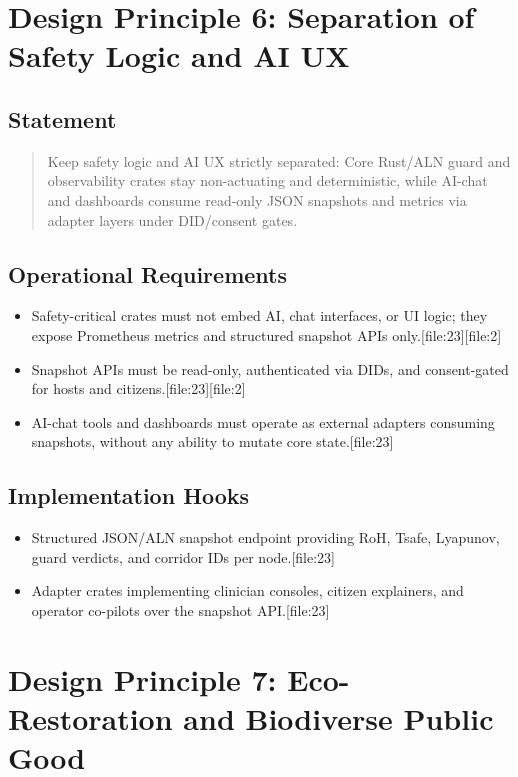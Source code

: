 \documentclass[11pt]{article}
\begin{document}
\section{Design Principle 6: Separation of Safety Logic and AI UX}

\subsection{Statement}

\begin{quote}
Keep safety logic and AI UX strictly separated: Core Rust/ALN guard and observability crates stay non-actuating and deterministic, while AI-chat and dashboards consume read-only JSON snapshots and metrics via adapter layers under DID/consent gates.
\end{quote}

\subsection{Operational Requirements}

\begin{itemize}[nosep]
  \item Safety-critical crates must not embed AI, chat interfaces, or UI logic; they expose Prometheus metrics and structured snapshot APIs only.[file:23][file:2]
  \item Snapshot APIs must be read-only, authenticated via DIDs, and consent-gated for hosts and citizens.[file:23][file:2]
  \item AI-chat tools and dashboards must operate as external adapters consuming snapshots, without any ability to mutate core state.[file:23]
\end{itemize}

\subsection{Implementation Hooks}

\begin{itemize}[nosep]
  \item Structured JSON/ALN snapshot endpoint providing RoH, Tsafe, Lyapunov, guard verdicts, and corridor IDs per node.[file:23]
  \item Adapter crates implementing clinician consoles, citizen explainers, and operator co-pilots over the snapshot API.[file:23]
\end{itemize}

\section{Design Principle 7: Eco-Restoration and Biodiverse Public Good}
\end{document}
